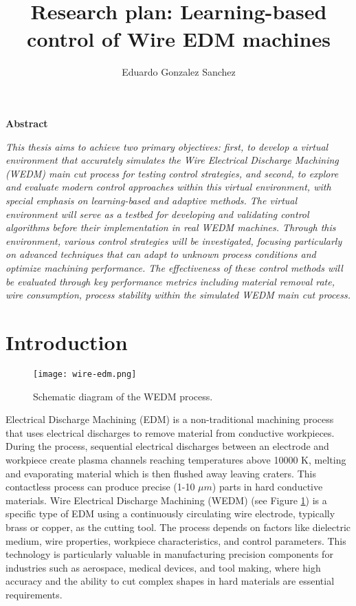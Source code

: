 \documentclass[11pt]{article}
\date{}
\begin{document}
\title{%
\\[1cm]
Research plan: Learning-based control of Wire EDM machines
}
\author{Eduardo Gonzalez Sanchez}
\date{}
\maketitle


\begin{center}
    \vspace{0.9cm}
\textbf{Abstract}
\end{center}

\textit{This thesis aims to achieve two primary objectives: first, to develop a virtual environment that accurately simulates the Wire Electrical Discharge Machining (WEDM) main cut process for testing control strategies, and second, to explore and evaluate modern control approaches within this virtual environment, with special emphasis on learning-based and adaptive methods. The virtual environment will serve as a testbed for developing and validating control algorithms before their implementation in real WEDM machines. Through this environment, various control strategies will be investigated, focusing particularly on advanced techniques that can adapt to unknown process conditions and optimize machining performance. 
The effectiveness of these control methods will be evaluated through key performance metrics including material removal rate, wire consumption, process stability within the simulated WEDM main cut process.}

\section{Introduction}
\begin{figure}[h]
    \centering
    \texttt{[image: wire-edm.png]}
    \caption{Schematic diagram of the WEDM process. }
    \label{fig:wire_edm}
    \end{figure}


Electrical Discharge Machining (EDM) is a non-traditional machining process that uses electrical discharges to remove material from conductive workpieces. During the process, sequential electrical discharges between an electrode and workpiece create plasma channels reaching temperatures above 10000 K, melting and evaporating material which is then flushed away leaving craters. This contactless process can produce precise (1-10 $\mu m$) parts in hard conductive materials. Wire Electrical Discharge Machining (WEDM) (see Figure \ref{fig:wire_edm}) is a specific type of EDM using a continuously circulating wire electrode, typically brass or copper, as the cutting tool. The process depends on factors like dielectric medium, wire properties, workpiece characteristics, and control parameters. This technology is particularly valuable in manufacturing 
precision components for industries such as aerospace, medical devices, and tool making, where high accuracy and the ability to 
cut complex shapes in hard materials are essential requirements.
\end{document}

